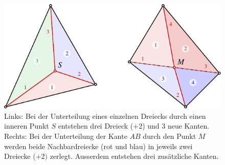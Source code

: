 %
%
%
\begin{figure}
\centering
\includegraphics{chapters/120-topologie/images/unterteilung.pdf}
\caption{Links: Bei der Unterteilung eines einzelnen Dreiecks durch einen
inneren Punkt $S$ entstehen drei Dreieck ($+2$) und 3 neue Kanten.
Rechts: Bei der Unterteilung der Kante $AB$ durch den Punkt $M$ werden
%
beide Nachbardreiecke (rot und blau) in jeweils zwei Dreiecke ($+2)$ zerlegt.
Ausserdem entstehen drei zusätzliche Kanten.
\label{buch:topologie:eulercharakteristik:fig:unterteilung}}
\end{figure}
